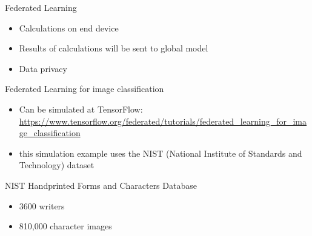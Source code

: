 \documentclass{beamer}{}
\begin{document}
\begin{frame} {Federated Learning}
        \begin{itemize}[<+->]
           \item Calculations on end device
           \item Results of calculations will be sent to global model
           \item Data privacy
        \end{itemize}        
    \end{frame}

\begin{frame} {Federated Learning for image classification}
    \begin {itemize}[<+->]
        \item Can be simulated at TensorFlow:
        \url{https://www.tensorflow.org/federated/tutorials/federated_learning_for_image_classification}
        \item this simulation example uses the NIST (National Institute of Standards and Technology) dataset
    \end{itemize}
\end{frame}

\begin{frame} {NIST Handprinted Forms and Characters Database}
    \begin{itemize}[<+->]
        \item 3600 writers
        \item 810,000 character images
    \end{itemize}
\end{frame}
\end{document}
